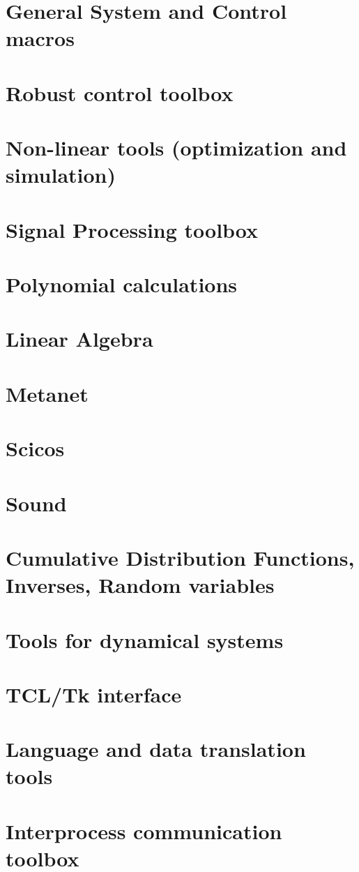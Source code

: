 \chapter{General System and Control macros}
         
\chapter{Robust control toolbox}
         
\chapter{Non-linear tools (optimization and simulation) }
        
\chapter{Signal Processing toolbox}
        
        
\chapter{Polynomial calculations}
        
\chapter{Linear Algebra}
        
\chapter{Metanet}
        
\chapter{Scicos} 
        
\chapter{Sound} 
        
\chapter{Cumulative Distribution Functions, Inverses, Random variables}
        
\chapter{Tools for dynamical systems}
        
\chapter{TCL/Tk interface}
        
\chapter{Language and data translation tools}
        
\chapter{Interprocess communication toolbox}
        
\printindex

